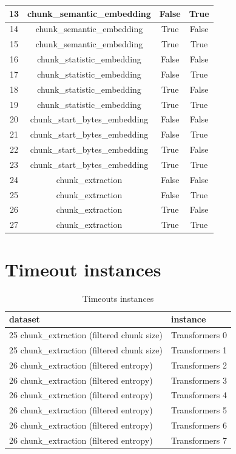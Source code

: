 \begin{longtable}{|c|c|c|c|}
\hline
13 & chunk\_semantic\_embedding & False & True \\
\hline
14 & chunk\_semantic\_embedding & True & False \\
\hline
15 & chunk\_semantic\_embedding & True & True \\
\hline
16 & chunk\_statistic\_embedding & False & False \\
\hline
17 & chunk\_statistic\_embedding & False & True \\
\hline
18 & chunk\_statistic\_embedding & True & False \\
\hline
19 & chunk\_statistic\_embedding & True & True \\
\hline
20 & chunk\_start\_bytes\_embedding & False & False \\
\hline
21 & chunk\_start\_bytes\_embedding & False & True \\
\hline
22 & chunk\_start\_bytes\_embedding & True & False \\
\hline
23 & chunk\_start\_bytes\_embedding & True & True \\
\hline
24 & chunk\_extraction & False & False \\
\hline
25 & chunk\_extraction & False & True \\
\hline
26 & chunk\_extraction & True & False \\
\hline
27 & chunk\_extraction & True & True \\
\hline
\end{longtable}

\section{Timeout instances}

\label{sec:annexe:timeout_instances}

\begin{table}[H]
\centering
\begin{tabular}{ll}
\hline
dataset & instance \\ 
\hline
25 chunk\_extraction (filtered chunk size) & Transformers 0 \\ 
25 chunk\_extraction (filtered chunk size) & Transformers 1 \\ 
26 chunk\_extraction (filtered entropy) & Transformers 2 \\ 
26 chunk\_extraction (filtered entropy) & Transformers 3 \\ 
26 chunk\_extraction (filtered entropy) & Transformers 4 \\ 
26 chunk\_extraction (filtered entropy) & Transformers 5 \\ 
26 chunk\_extraction (filtered entropy) & Transformers 6 \\ 
26 chunk\_extraction (filtered entropy) & Transformers 7 \\ 
\hline
\end{tabular}
\caption{Timeouts instances}
\label{tab:timeouts}
\end{table}

